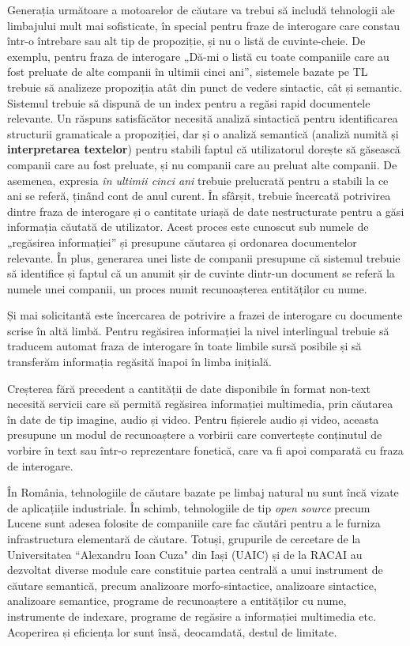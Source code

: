 \begin{multicols}{2}
Generația următoare a motoarelor de căutare va trebui să includă tehnologii ale limbajului mult mai sofisticate, în special pentru fraze de interogare care constau într-o întrebare sau alt tip de propoziție, și nu o listă de cuvinte-cheie. De exemplu, pentru fraza de interogare „Dă-mi o listă cu toate companiile care au fost preluate de alte companii în ultimii cinci ani”, sistemele bazate pe TL trebuie să analizeze propoziția atât din punct de vedere sintactic, cât și semantic. Sistemul trebuie să dispună de un index pentru a regăsi rapid documentele relevante. Un răspuns satisfăcător necesită analiză sintactică pentru identificarea structurii gramaticale a propoziției, dar și o analiză semantică (analiză numită și \textbf{interpretarea textelor}) pentru stabili faptul că utilizatorul dorește să găsească companii care au fost preluate, și nu companii care au preluat alte companii. De asemenea, expresia \textit{în ultimii cinci ani} trebuie prelucrată pentru a stabili la ce ani se referă, ținând cont de anul curent. În sfârșit, trebuie încercată potrivirea dintre fraza de interogare și o cantitate uriașă de date nestructurate pentru a găsi informația căutată de utilizator. Acest proces este cunoscut sub numele de „regăsirea informației” și presupune căutarea și ordonarea documentelor relevante. În plus, generarea unei liste de companii presupune că sistemul trebuie să identifice și faptul că un anumit șir de cuvinte dintr-un document se referă la numele unei companii, un proces numit recunoașterea entităților cu nume.

Și mai solicitantă este încercarea de potrivire a frazei de interogare cu documente scrise în altă limbă. Pentru regăsirea informației la nivel interlingual trebuie să traducem automat fraza de interogare în toate limbile sursă posibile și să transferăm informația regăsită înapoi în limba inițială. 

Creșterea fără precedent a cantității de date disponibile în format non-text necesită servicii care să permită regăsirea informației multimedia, prin căutarea în date de tip imagine, audio și video. Pentru fișierele audio și video, aceasta presupune un modul de recunoaștere a vorbirii care convertește conținutul de vorbire în text sau într-o reprezentare fonetică, care va fi apoi comparată cu fraza de interogare.

În România, tehnologiile de căutare bazate pe limbaj natural nu sunt încă vizate de aplicațiile industriale. În schimb, tehnologiile de tip \textit{open source} precum Lucene sunt adesea folosite de companiile care fac căutări pentru a le furniza infrastructura elementară de căutare. Totuși, grupurile de cercetare de la Universitatea ``Alexandru Ioan Cuza" din Iași (UAIC) și de la RACAI au dezvoltat diverse module care constituie partea centrală a unui instrument de căutare semantică, precum analizoare morfo-sintactice, analizoare sintactice, analizoare semantice, programe de recunoaștere a entităților cu nume, instrumente de indexare, programe de regăsire a informației multimedia etc. Acoperirea și eficiența lor sunt însă, deocamdată,  destul de limitate.


\end{multicols}
